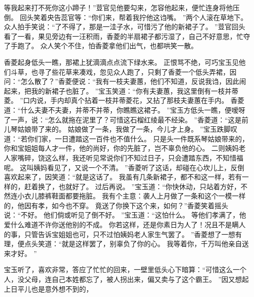 等我起来打不死你这小蹄子！”荳官见他要勾来，怎容他起来，便忙连身将他压倒。
回头笑着央告蕊官等：“你们来，帮着我拧他这诌嘴。
”两个人滚在草地下。
众人拍手笑说：“了不得了，那是一洼子水，可惜污了他的新裙子了。
”荳官回头看了一看，果见旁边有一汪积雨，香菱的半扇裙子都污湿了，自己不好意思，忙夺了手跑了。
众人笑个不住，怕香菱拿他们出气，也都哄笑一散。
\par
香菱起身低头一瞧，那裙上犹滴滴点点流下绿水来。
正恨骂不绝，可巧宝玉见他们斗草，也寻了些花草来凑戏，忽见众人跑了，只剩了香菱一个低头弄裙，因问：“怎么散了？”香菱便说：“我有一枝夫妻蕙，他们不知道，反说我诌，因此闹起来，把我的新裙子也脏了。
”宝玉笑道：“你有夫妻蕙，我这里倒有一枝并蒂菱。
”口内说，手内却真个拈着一枝并蒂菱花，又拈了那枝夫妻蕙在手内。
香菱道：“什么夫妻不夫妻，并蒂不并蒂，你瞧瞧这裙子。
”宝玉方低头一瞧，便嗳呀了一声，说：“怎么就拖在泥里了？可惜这石榴红绫最不经染。
”香菱道：“这是前儿琴姑娘带了来的。
姑娘做了一条，我做了一条，今儿才上身。
”宝玉跌脚叹道：“若你们家，一日遭踏这一百件也不值什么。
只是头一件既系琴姑娘带来的，你和宝姐姐每人才一件，他的尚好，你的先脏了，岂不辜负他的心。
二则姨妈老人家嘴碎，饶这么样，我还听见常说你们不知过日子，只会遭踏东西，不知惜福呢。
这叫姨妈看见了，又说一个不清。
”香菱听了这话，却碰在心坎儿上，反倒喜欢起来了，因笑道：“就是这话了。
我虽有几条新裙子，都不和这一样，若有一样的，赶着换了，也就好了。
过后再说。
”宝玉道：“你快休动，只站着方好，不然连小衣儿膝裤鞋面都要拖脏。
我有个主意：袭人上月做了一条和这个一模一样的，他因有孝，如今也不穿。
竟送了你换下这个来，如何？”香菱笑着摇头说：“不好。
他们倘或听见了倒不好。
”宝玉道：“这怕什么。
等他们孝满了，他爱什么难道不许你送他别的不成。
你若这样，还是你素日为人了！况且不是瞒人的事，只管告诉宝姐姐也可，只不过怕姨妈老人家生气罢了。
”香菱想了一想有理，便点头笑道：“就是这样罢了，别辜负了你的心。
我等着你，千万叫他亲自送来才好。
”
\par
宝玉听了，喜欢非常，答应了忙忙的回来，一壁里低头心下暗算：“可惜这么一个人，没父母，连自己本姓都忘了，被人拐出来，偏又卖与了这个霸王。
”因又想起上日平儿也是意外想不到的，
